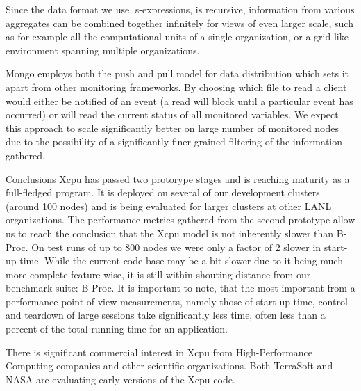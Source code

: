 \documentclass[11pt]{p9article}
\makeatletter
\renewcommand\section{\@startsection {section}{1}{\z@} {3pt} {1pt} {\normalfont\normalsize\bfseries}}
\makeatother
\begin{document}
Since the data format we use, s-expressions, is recursive, information
from various aggregates can be combined together infinitely for
views of even larger scale, such as for example all the computational
units of a single organization, or a grid-like environment spanning
multiple organizations.  

Mongo employs both the push and pull model for data distribution
which sets it apart from other monitoring frameworks. By choosing
which file to read a client would either be notified of an event
(a read will block until a particular event has occurred) or will
read the current status of all monitored variables. We expect this
approach to scale significantly better on large number of monitored
nodes due to the possibility of a significantly finer-grained
filtering of the information gathered.

\section{Conclusions}
Xcpu has passed two protorype stages and is reaching maturity as a
full-fledged program. It is deployed on several of our development
clusters (around 100 nodes) and is being evaluated for larger
clusters at other LANL organizations. The performance metrics
gathered from the second prototype allow us to reach the conclusion
that the Xcpu model is not inherently slower than B-Proc. On test
runs of up to 800 nodes we were only a factor of 2 slower in start-up
time. While the current code base may be a bit slower due to it
being much more complete feature-wise, it is still within shouting
distance from our benchmark suite: B-Proc. It is important to note,
that the most important from a performance point of view measurements,
namely those of start-up time, control and teardown of large sessions
take significantly less time, often less than a percent of the total
running time for an application.

There is significant commercial interest in Xcpu from High-Performance
Computing companies and other scientific organizations. Both TerraSoft
and NASA are evaluating early versions of the Xcpu code.



\end{document}
